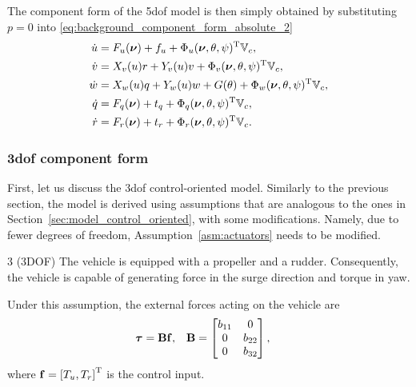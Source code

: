 The component form of the 5\gls{dof} model is then simply obtained by substituting $p = 0$ into \eqref{eq:background_component_form_absolute_2}
\begin{subequations}
    \begin{align}
        \dot{u} &= F_u(\bm{\nu}) + f_u + \Phi_u(\bm{\nu}, \theta, \psi)^{\mathrm{T}}\mathbb{V}_c, \\
        \dot{v} &= X_v(u)r + Y_v(u)v + \Phi_v(\bm{\nu}, \theta, \psi)^{\mathrm{T}}\mathbb{V}_c, \\
        \dot{w} &= X_w(u)q + Y_w(u)w + G(\theta) + \Phi_w(\bm{\nu}, \theta, \psi)^{\mathrm{T}}\mathbb{V}_c, \\
        \dot{q} &= F_q(\bm{\nu}) + t_q + \Phi_q(\bm{\nu}, \theta, \psi)^{\mathrm{T}}\mathbb{V}_c, \\
        \dot{r} &= F_r(\bm{\nu}) + t_r + \Phi_r(\bm{\nu}, \theta, \psi)^{\mathrm{T}}\mathbb{V}_c.
    \end{align}
    \label{eq:background_component_form_5DOF}
\end{subequations}

\subsubsection{3\gls{dof} component form}
First, let us discuss the 3\gls{dof} control-oriented model.
Similarly to the previous section, the model is derived using assumptions that are analogous to the ones in Section~\ref{sec:model_control_oriented}, with some modifications.
Namely, due to fewer degrees of freedom, Assumption~\ref{asm:actuators} needs to be modified.

\begin{customasm}{3 (3DOF)}
    \label{asm:actuators_3DOF}
    The vehicle is equipped with a propeller and a rudder.
    Consequently, the vehicle is capable of generating force in the surge direction and torque in yaw.
\end{customasm}

Under this assumption, the external forces acting on the vehicle are
\begin{align}
    \bm{\tau} &= \mathbf{B}\mathbf{f}, &
    \mathbf{B} &= 
    \begin{bmatrix}
        b_{11} & 0 \\ 0 & b_{22} \\ 0 & b_{32}
    \end{bmatrix},
\end{align}
where $\mathbf{f} = \left[T_u, T_r\right]^{\mathrm{T}}$ is the control input.

